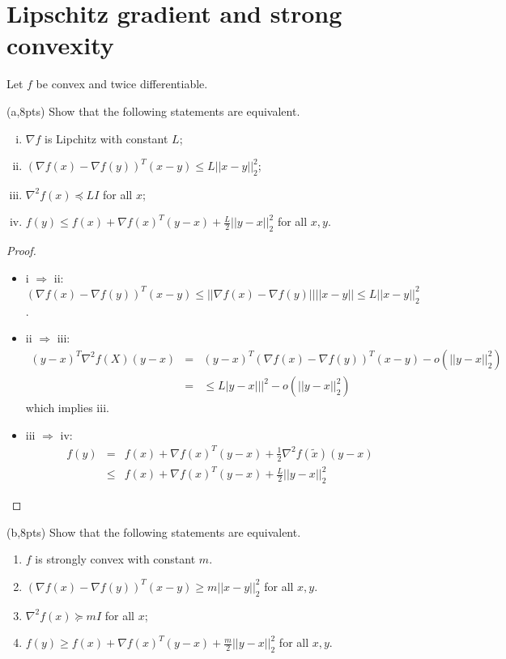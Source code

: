 \documentclass{article}     %
\begin{document}
\section{Lipschitz gradient and strong convexity}
Let $f$ be convex and twice differentiable.

(a,8pts) Show that the following statements are equivalent.
\begin{enumerate}[i.]
    \item $\nabla f $ is Lipchitz with constant $L$;
    \item $ (\nabla f(x)-\nabla f(y))^T(x-y)\leq L||x-y||_2^2$;
    \item $\nabla^2 f(x) \preccurlyeq LI$ for all $x$;
    \item $f(y)\leq f(x) +\nabla f(x)^T(y-x)+\frac{L}{2}||y-x||^2_2$ for all $x,y$.
    \end{enumerate}

\begin{proof}
\begin{itemize}
    \item  i $\Rightarrow$ ii: $ (\nabla f(x)-\nabla f(y))^T(x-y)\leq ||\nabla f(x)-\nabla f(y)||||x-y||\leq L||x-y||_2^2$.
    \item  ii $\Rightarrow$ iii:
    \begin{eqnarray*} 
        (y-x)^T\nabla^2 f(X)(y-x)& = &(y-x)^T(\nabla f(x)-\nabla f(y))^T(x-y)-o(||y-x||_2^2)\\
        & = & \leq L|y-x|||^2-o(||y-x||_2^2)
    \end{eqnarray*}
    which implies iii.
     
    \item iii $\Rightarrow$ iv:
\begin{eqnarray*} 
         f(y) & = & f(x) +\nabla f(x)^T(y-x)+\frac{1}{2}\nabla^2 f(\widetilde{x})(y-x)\\
       & \leq &  f(x) +\nabla f(x)^T(y-x)+\frac{L}{2}||y-x||^2_2
    \end{eqnarray*}

    \end{itemize}
\end{proof}

(b,8pts) Show that the following statements are equivalent.
\begin{enumerate}[i]
    \item $f$ is strongly convex with constant $m$.
    \item $ (\nabla f(x)-\nabla f(y))^T(x-y)\geq m||x-y||_2^2$ for all $x,y$.
    \item $\nabla^2 f(x)\succcurlyeq m I$ for all $x$;
    \item $f(y)\geq f(x) +\nabla f(x)^T(y-x)+\frac{m}{2}||y-x||^2_2$ for all $x,y$.
\end{enumerate}
\end{document}
